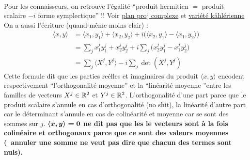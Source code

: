 \\
Pour les connaisseurs, on retrouve l'égalité ``produit hermitien $=$ produit scalaire $-i$ forme symplectique'' !!
Voir
\href{https://fr.wikipedia.org/wiki/Espace_projectif#Espace_projectif_complexe}{plan proj complexe} et \href{https://fr.wikipedia.org/wiki/Vari%C3%A9t%C3%A9_k%C3%A4hl%C3%A9rienne}{variété kählérienne }
\\

On a aussi l'écriture (quand-même moins clair) :
\begin{align*}
\langle x,y \rangle &= \langle x_1, y_1\rangle + \langle x_2, y_2\rangle 
+ i\big(\langle x_2, y_1\rangle - \langle x_1,y_2\rangle\big) \\
&= \sum_j x^j_1 y^j_1+ x^j_2 y^j_2+ i\sum_j \big( x^j_2 y^j_1 - x^j_1y^j_2 \big) \\
&= \sum_j \big\langle X^j,Y^j\big\rangle - i\sum_j \det(X^j, Y^j)
\end{align*}
Cette formule dit que les parties reélles et imaginaires du produit $\langle x,y \rangle$ encodent respectivement ``l'orthogonalité moyenne'' et la ``linéarité moyenne ''entre les familles de vecteurs $X^j\in\R^2$ et $Y^j\in\R^2$. L'orthogonalité d'une part parce que le produit scalaire s'annule en cas d'orthogonalité (no shit), la linéarité d'autre part car le déterminant s'annule en cas de colinéarité et moyenne car se sont des sommes sur $j$. \textbf{$\bf{\langle x,y \rangle=0}$ ne dit pas que les le vecteurs sont à la fois colinéaire et orthogonaux parce que ce sont des valeurs moyennes (\ie~annuler une somme ne veut pas dire que chacun des termes sont nuls).}
\\


